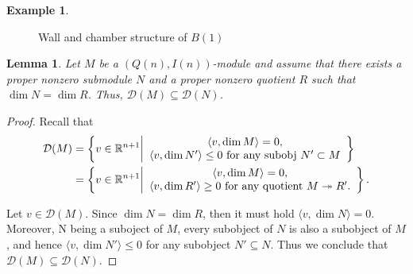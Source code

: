 \documentclass[11pt]{amsart}
\newtheorem{lemma}[theorem]{Lemma}
\theoremstyle{definition}
\newtheorem{example}[theorem]{Example}
\begin{document}
\begin{example}
\begin{figure}[ht!]
\centering
{}
\caption{Wall and chamber structure of $B(1)$}\label{fig:WCB1}
\end{figure}
    \end{example}


\begin{lemma}\label{lemma : stab space proper subobj and proper quot}
    Let $M$ be a $(Q(n), I(n))$-module and assume that there exists a proper nonzero submodule $N$ and a proper nonzero quotient $R$ such that $\dim N=\dim R$. Thus, $\mathcal{D}(M)\subseteq\mathcal{D}(N)$. 
\end{lemma}
\begin{proof}
    Recall that 
    \begin{align*}
\mathcal{D}(M)&=\left\{v\in\mathbb{R}^{n+1}\middle\vert \begin{array}{c}\langle v,\dim M\rangle=0, \\
\langle v,
\dim N'\rangle\leq 0
\hbox{ for any subobj } N'\subset M\end{array}
\right\}\\
&=\left\{v\in\mathbb{R}^{n+1}\middle\vert \begin{array}{c}\langle v,\dim M\rangle=0, \\
\langle v,
\dim R'\rangle\geq 0
\hbox{ for any quotient } M\twoheadrightarrow R'.  \end{array}
\right\}.
    \end{align*}

Let $v\in \mathcal{D}(M)$. Since $\dim N=\dim R$,  then it must hold $\langle v, \dim N\rangle=0$. Moreover, N being a suboject of $M$, every subobject of $N$ is also a subobject of $M$, and hence $\langle v, \dim N'\rangle\leq 0$ for any subobject $N'\subseteq N$. Thus we conclude that $\mathcal{D}(M)\subseteq\mathcal{D}(N)$.    
\end{proof}
\end{document}
